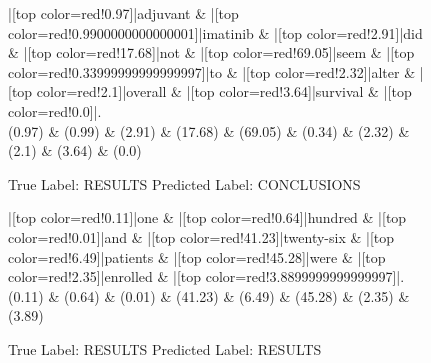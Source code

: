 \documentclass[a4paper, landscape]{article}
\begin{document}
\begin{figure}
\begin{center}
\begin{dependency}
\begin{deptext}
|[top color=red!0.97]|adjuvant \& |[top color=red!0.9900000000000001]|imatinib \& |[top color=red!2.91]|did \& |[top color=red!17.68]|not \& |[top color=red!69.05]|seem \& |[top color=red!0.33999999999999997]|to \& |[top color=red!2.32]|alter \& |[top color=red!2.1]|overall \& |[top color=red!3.64]|survival \& |[top color=red!0.0]|.\\
(0.97) \& (0.99) \& (2.91) \& (17.68) \& (69.05) \& (0.34) \& (2.32) \& (2.1) \& (3.64) \& (0.0)\\
\end{deptext}
\end{dependency}
\end{center}
\caption{True Label: RESULTS Predicted Label: CONCLUSIONS}
\end{figure}
\clearpage
\begin{figure}
\begin{center}
\begin{dependency}
\begin{deptext}
|[top color=red!0.11]|one \& |[top color=red!0.64]|hundred \& |[top color=red!0.01]|and \& |[top color=red!41.23]|twenty-six \& |[top color=red!6.49]|patients \& |[top color=red!45.28]|were \& |[top color=red!2.35]|enrolled \& |[top color=red!3.8899999999999997]|.\\
(0.11) \& (0.64) \& (0.01) \& (41.23) \& (6.49) \& (45.28) \& (2.35) \& (3.89)\\
\end{deptext}
\end{dependency}
\end{center}
\caption{True Label: RESULTS Predicted Label: RESULTS}
\end{figure}
\clearpage
\end{document}
